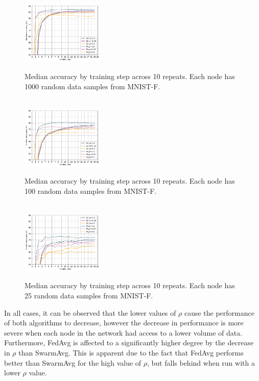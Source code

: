 \documentclass[letterpaper, 10 pt, conference]{ieeeconf}  %
\begin{document}
\begin{figure}[H]
	 \\
	\includegraphics[width=0.35\textwidth]{conf_sparse_ns1000}
	\caption{Median accuracy by training step across 10 repeats. Each node has 1000 random data samples from MNIST-F.}
	\label{aeg4}
\end{figure}

\begin{figure}[H] 
	 \\
	\includegraphics[width=0.35\textwidth]{conf_sparse_ns100}
	\caption{Median accuracy by training step across 10 repeats. Each node has 100 random data samples from MNIST-F.}
	\label{aeg5}
\end{figure}

\begin{figure}[H] 
	 \\
	\includegraphics[width=0.35\textwidth]{conf_sparse_ns25}
	\caption{Median accuracy by training step across 10 repeats. Each node has 25 random data samples from MNIST-F.}
	\label{aeg6}
\end{figure}

In all cases, it can be observed that the lower values of $\rho$ cause the performance of both algorithms to decrease, however the decrease in performance is more severe when each node in the network had access to a lower volume of data. Furthermore, FedAvg is affected to a significantly higher degree by the decrease in $\rho$ than SwarmAvg. This is apparent due to the fact that FedAvg performs better than SwarmAvg for the high value of $\rho$, but falls behind when run with a lower $\rho$ value.
\end{document}
